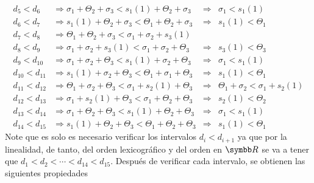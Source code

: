 \documentclass{article}
\begin{document}
\begin{itemize}
\begin{align}
            d_5 < d_6       &\Rightarrow \sigma_1 + \Theta_2 + \sigma_3 < s_1(1) + \Theta_2 + \sigma_3     &\Rightarrow& \sigma_1 < s_1(1)                            \tag{1}\label{repeated-1} \\
            d_6 < d_7       &\Rightarrow s_1(1) + \Theta_2 + \sigma_3   < \Theta_1 + \Theta_2 + \sigma_3   &\Rightarrow& s_1(1) < \Theta_1                            \tag{2}\label{repeated-2} \\
            d_7 < d_8       &\Rightarrow \Theta_1 + \Theta_2 + \sigma_3 < \sigma_1 + \sigma_2 + s_3(1)     &\phantom{\Rightarrow}&                                    \tag{5}\label{eq-5} \\ 
            d_8 < d_9       &\Rightarrow \sigma_1 + \sigma_2 + s_3(1)   < \sigma_1 + \sigma_2 + \Theta_3   &\Rightarrow& s_3(1) < \Theta_3                            \tag{6}\label{eq-6} \\
            d_9 < d_{10}    &\Rightarrow \sigma_1 + \sigma_2 + \Theta_3 < s_1(1) + \sigma_2 + \Theta_3     &\Rightarrow& \sigma_1 < s_1(1)                            \tag{1}\label{repeated-1-2} \\
            d_{10} < d_{11} &\Rightarrow s_1(1) + \sigma_2 + \Theta_3   < \Theta_1 + \sigma_1 + \Theta_3   &\Rightarrow& s_1(1) < \Theta_1                            \tag{2}\label{repeated-2-2} \\
            d_{11} < d_{12} &\Rightarrow \Theta_1 + \sigma_2 + \Theta_3 < \sigma_1 + s_2(1) + \Theta_3     &\Rightarrow& \Theta_1 + \sigma_2 < \sigma_1 + s_2(1)      \tag{3}\label{repeated-3} \\
            d_{12} < d_{13} &\Rightarrow \sigma_1 + s_2(1) + \Theta_3   < \sigma_1 + \Theta_2 + \Theta_3   &\Rightarrow& s_2(1) < \Theta_2                            \tag{4}\label{repeated-4} \\
            d_{13} < d_{14} &\Rightarrow \sigma_1 + \Theta_2 + \Theta_3 < s_1(1) + \Theta_2 + \Theta_3     &\Rightarrow& \sigma_1 < s_1(1)                            \tag{1}\label{repeated-1-3} \\
            d_{14} < d_{15} &\Rightarrow s_1(1) + \Theta_2 + \Theta_3   < \Theta_1 + \Theta_2 + \Theta_3   &\Rightarrow& s_1(1) < \Theta_1                            \tag{2}\label{repeated-2-3}
        \end{align}
        Note que es solo es necesario verificar los intervalos \(d_i < d_{i+1}\) ya que por la linealidad, de tanto, del orden lexicográfico y del orden en \(\realR\)
        se va a tener que \(d_1 < d_2 < \cdots < d_{14} < d_{15}\). Después de verificar cada intervalo, se obtienen las siguientes propiedades \\

\end{itemize}
\end{document}
